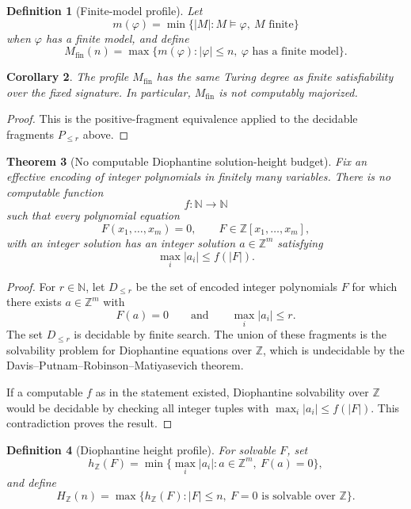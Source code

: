 \documentclass[11pt]{article}
\newtheorem{theorem}{Theorem}[section]
\newtheorem{corollary}[theorem]{Corollary}
\newtheorem{definition}[theorem]{Definition}
\begin{document}
\begin{definition}[Finite-model profile]
Let
\[
m(\varphi)=\min\{|M|:M\models\varphi,\ M\text{ finite}\}
\]
when \(\varphi\) has a finite model, and define
\[
M_{\mathrm{fin}}(n)=
\max\{m(\varphi):|\varphi|\leq n,\ \varphi\text{ has a finite model}\}.
\]
\end{definition}

\begin{corollary}
The profile \(M_{\mathrm{fin}}\) has the same Turing degree as finite satisfiability over the fixed signature. In particular, \(M_{\mathrm{fin}}\) is not computably majorized.
\end{corollary}

\begin{proof}
This is the positive-fragment equivalence applied to the decidable fragments \(P_{\leq r}\) above.
\end{proof}

\begin{theorem}[No computable Diophantine solution-height budget]
Fix an effective encoding of integer polynomials in finitely many variables. There is no computable function
\[
f:\mathbb N\to\mathbb N
\]
such that every polynomial equation
\[
F(x_1,\ldots,x_m)=0,\qquad F\in\mathbb Z[x_1,\ldots,x_m],
\]
with an integer solution has an integer solution \(a\in\mathbb Z^m\) satisfying
\[
\max_i |a_i|\leq f(|F|).
\]
\end{theorem}

\begin{proof}
For \(r\in\mathbb N\), let \(D_{\leq r}\) be the set of encoded integer polynomials \(F\) for which there exists \(a\in\mathbb Z^m\) with
\[
F(a)=0
\qquad\text{and}\qquad
\max_i|a_i|\leq r.
\]
The set \(D_{\leq r}\) is decidable by finite search. The union of these fragments is the solvability problem for Diophantine equations over \(\mathbb Z\), which is undecidable by the Davis--Putnam--Robinson--Matiyasevich theorem.

If a computable \(f\) as in the statement existed, Diophantine solvability over \(\mathbb Z\) would be decidable by checking all integer tuples with \(\max_i|a_i|\leq f(|F|)\). This contradiction proves the result.
\end{proof}

\begin{definition}[Diophantine height profile]
For solvable \(F\), set
\[
h_{\mathbb Z}(F)=
\min\{\max_i|a_i|:a\in\mathbb Z^m,\ F(a)=0\},
\]
and define
\[
H_{\mathbb Z}(n)=
\max\{h_{\mathbb Z}(F):|F|\leq n,\ F=0\text{ is solvable over }\mathbb Z\}.
\]
\end{definition}
\end{document}
